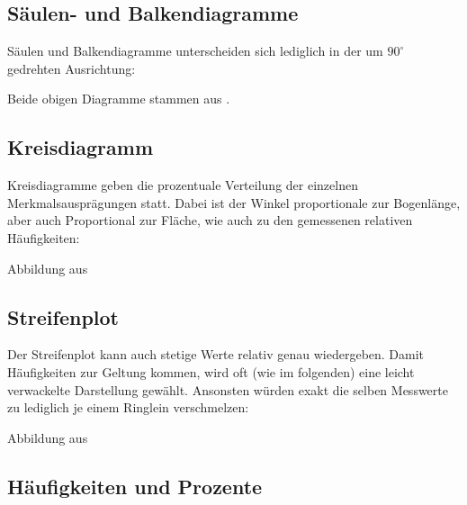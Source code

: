 \subsection{Säulen- und
  Balkendiagramme}
Säulen und Balkendiagramme unterscheiden sich lediglich in der um $90^\circ$ gedrehten Ausrichtung:
\begin{center}
\end{center}
Beide obigen Diagramme stammen aus \cite{marthaler17}.

\subsection{Kreisdiagramm}
Kreisdiagramme geben die prozentuale Verteilung der einzelnen Merkmalsausprägungen statt. Dabei ist der Winkel proportionale zur Bogenlänge, aber auch Proportional zur Fläche, wie auch zu den gemessenen relativen Häufigkeiten:


Abbildung aus \cite{marthaler17}
\newpage

\subsection{Streifenplot}
Der Streifenplot kann auch stetige Werte relativ genau wiedergeben. Damit Häufigkeiten zur Geltung kommen, wird oft (wie im folgenden) eine leicht verwackelte Darstellung gewählt. Ansonsten würden exakt die selben Messwerte zu lediglich je einem Ringlein verschmelzen:


Abbildung aus \cite{marthaler17}
\newpage


\subsection{Häufigkeiten und Prozente}

